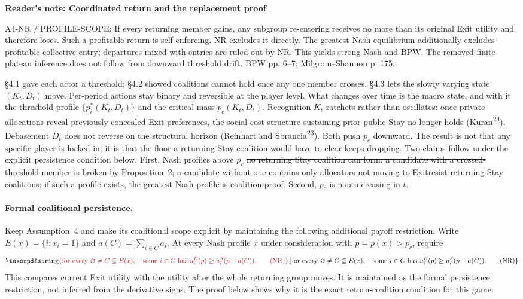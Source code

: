 \documentclass[12pt]{article}
\theoremstyle{definition}
\theoremstyle{remark}
\providecommand{\DIFaddtex}[1]{{\color{AddedText}#1}}
\providecommand{\DIFdeltex}[1]{{\color{DeletedText}\sout{#1}}}
\providecommand{\DIFaddbegin}{}
\providecommand{\DIFaddend}{}
\providecommand{\DIFdelbegin}{}
\providecommand{\DIFdelend}{}
\newcommand{\ReviewNote}[2]{\par\begin{mdframed}[backgroundcolor=blue!3,linecolor=NoteText,linewidth=0.6pt]\color{NoteText}\small\textbf{Reader's note: #1}\par #2\end{mdframed}\par}
\providecommand{\DIFadd}[1]{\texorpdfstring{\DIFaddtex{#1}}{#1}} %
\providecommand{\DIFdel}[1]{\texorpdfstring{\DIFdeltex{#1}}{}} %
\begin{document}
\ReviewNote{Coordinated return and the replacement proof}{A4-NR / PROFILE-SCOPE: If every returning member gains, any subgroup re-entering receives no more than its original Exit utility and therefore loses. Such a profitable return is self-enforcing. NR excludes it directly. The greatest Nash equilibrium additionally excludes profitable collective entry; departures mixed with entries are ruled out by NR. This yields strong Nash and BPW. The removed finite-plateau inference does not follow from downward threshold drift. BPW pp. 6--7; Milgrom--Shannon p. 175.}
\S4.1 gave each actor a threshold; \S4.2 showed coalitions cannot hold once any one member crosses. \S4.3 lets the slowly varying state $(K_t, D_t)$ move. Per-period actions stay binary and reversible at the player level. What changes over time is the macro state, and with it the threshold profile $\{p_i^*(K_t, D_t)\}$ and the critical mass $p_c(K_t, D_t)$. Recognition $K_t$ ratchets rather than oscillates: once private allocations reveal previously concealed Exit preferences, the social cost structure sustaining prior public Stay no longer holds (Kuran\textsuperscript{24}). Debasement $D_t$ does not reverse on the structural horizon (Reinhart and Sbrancia\textsuperscript{23}). Both push $p_c$ downward. The result is not that any specific player is locked in; it is that the floor a returning Stay coalition would have to clear keeps dropping. Two claims follow \DIFaddbegin \DIFadd{under the explicit persistence condition below}\DIFaddend . First, \DIFaddbegin \DIFadd{Nash profiles }\DIFaddend above $p_c$ \DIFdelbegin \DIFdel{no returning Stay coalition can form: a candidate with a crossed-threshold member is broken by Proposition~2; a candidate without one contains only allocators not moving to Exit}\DIFdelend \DIFaddbegin \DIFadd{resist returning Stay coalitions; if such a profile exists, the greatest Nash profile is coalition-proof}\DIFaddend . Second, $p_c$ is non-increasing in $t$.

\DIFaddbegin \paragraph*{\DIFadd{Formal coalitional persistence.}}
\DIFadd{Keep Assumption~4 and make its coalitional scope explicit by maintaining the following additional payoff restriction. Write $E(x)=\{i:x_i=1\}$ and $a(C)=\sum_{i\in C}a_i$. At every Nash profile $x$ under consideration with $p=p(x)>p_c$, require
}\[
 \DIFadd{\text{for every }\varnothing\ne C\subseteq E(x),\quad
 \text{some }i\in C\text{ has }u_i^E(p)\ge u_i^S(p-a(C)).\tag{NR}
}\]
\DIFadd{This compares current Exit utility with the utility after the whole returning group moves. It is maintained as the formal persistence restriction, not inferred from the derivative signs. The proof below shows why it is the exact return-coalition condition for this game.
}
\end{document}
